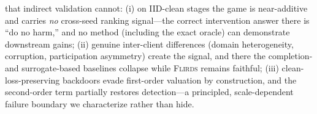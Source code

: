 \begin{enumerate}[leftmargin=2em, itemsep=2pt]
that indirect validation cannot: (i) on IID-clean stages the game is
near-additive and carries \emph{no} cross-seed ranking signal---the correct
intervention answer there is ``do no harm,'' and no method (including the exact
oracle) can demonstrate downstream gains; (ii) genuine inter-client differences
(domain heterogeneity, corruption, participation asymmetry) create the signal,
and there the completion- and surrogate-based baselines collapse while
\textsc{Flirds} remains faithful;
(iii) clean-loss-preserving backdoors evade first-order valuation by
construction, and the second-order term partially restores detection---a
principled, scale-dependent failure boundary we characterize rather than hide.
\end{enumerate}

